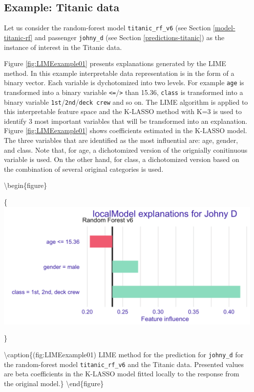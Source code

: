 \documentclass[12pt,]{krantz}
\begin{document}
\hypertarget{LIMEExample}{%
\subsection{Example: Titanic data}\label{LIMEExample}}

Let us consider the random-forest model \texttt{titanic\_rf\_v6} (see Section \ref{model-titanic-rf} and passenger \texttt{johny\_d} (see Section \ref{predictions-titanic}) as the instance of interest in the Titanic data.

Figure \ref{fig:LIMEexample01} presents explanations generated by the LIME method.
In this example interpretable data representation is in the form of a binary vector. Each variable is dychotomized into two levels. For example \texttt{age} is transformed into a binary variable \texttt{\textless{}=}/\texttt{\textgreater{}} than 15.36, \texttt{class} is transformed into a binary variable \texttt{1st}/\texttt{2nd}/\texttt{deck\ crew} and so on.
The LIME algorithm is applied to this interpretable feature space and the K-LASSO method with K=3 is used to identify 3 most important variables that will be transformed into an explanation.
Figure \ref{fig:LIMEexample01} shows coefficients estimated in the K-LASSO model.
The three variables that are identified as the most influential are: age, gender, and class. Note that, for age, a dichotomized version of the orignially conitinuous variable is used. On the other hand, for class, a dichotomized version based on the combination of several original categories is used.

\textbackslash{}begin\{figure\}

\{\centering \includegraphics[width=0.6\linewidth]{figure/LIMEexample01}

\}

\textbackslash{}caption\{(fig:LIMEexample01) LIME method for the prediction for \texttt{johny\_d} for the random-forest model \texttt{titanic\_rf\_v6} and the Titanic data. Presented values are beta coefficients in the K-LASSO model fitted locally to the response from the original model.\}\label{fig:LIMEexample01}
\textbackslash{}end\{figure\}
\end{document}
